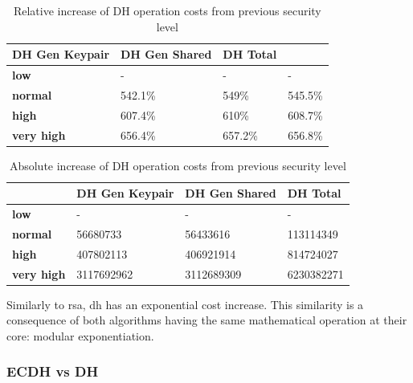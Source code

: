 \documentclass{llncs}
\begin{document}
\begin{table}[]
  \begin{tabular}{|l|l|l|l|}
  \hline
                     \textbf{DH Gen Keypair} & \textbf{DH Gen Shared}   & \textbf{DH Total}   \\ \hline
  \textbf{low}       & -                       & -                      & -                       \\ \hline
  \textbf{normal}    & 542.1\%                 & 549\%                  & 545.5\%                 \\ \hline
  \textbf{high}      & 607.4\%                 & 610\%                  & 608.7\%                 \\ \hline
  \textbf{very high} & 656.4\%                 & 657.2\%                & 656.8\%                 \\ \hline
  \end{tabular}
  \centering \caption{\label{table:dh-relative-cost-increase} Relative increase of DH operation costs from previous security level}
  \end{table}

  \begin{table}[]
    \begin{tabular}{|l|l|l|l|}
    \hline
                       & \textbf{DH Gen Keypair} & \textbf{DH Gen Shared} & \textbf{DH Total} \\ \hline
    \textbf{low}       & -                       & -                      & -                 \\ \hline
    \textbf{normal}    & 56680733                & 56433616               & 113114349         \\ \hline
    \textbf{high}      & 407802113               & 406921914              & 814724027         \\ \hline
    \textbf{very high} & 3117692962              & 3112689309             & 6230382271        \\ \hline
    \end{tabular}
    \centering \caption{\label{table:dh-absolute-cost-increase} Absolute increase of DH operation costs from previous security level}
    \end{table}

Similarly to \gls{rsa}, \gls{dh} has an exponential cost increase. This similarity is a consequence of both algorithms having the same mathematical
operation at their core: modular exponentiation.

\subsubsection{ECDH vs DH}
\end{document}
